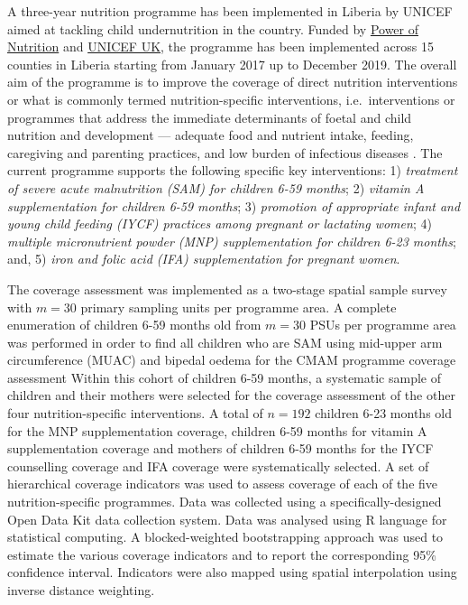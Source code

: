 \documentclass[12pt,a4paper]{article}
\begin{document}
A three-year nutrition programme has been implemented in Liberia by UNICEF aimed at tackling child undernutrition in the country. Funded by \href{http://www.powerofnutrition.org}{Power of Nutrition} and \href{https://www.unicef.org.uk}{UNICEF UK}, the programme has been implemented across 15 counties in Liberia starting from January 2017 up to December 2019. The overall aim of the programme is to improve the coverage of direct nutrition interventions or what is commonly termed nutrition-specific interventions, i.e.~interventions or programmes that address the immediate determinants of foetal and child nutrition and development --- adequate food and nutrient intake, feeding, caregiving and parenting practices, and low burden of infectious diseases \citep{Bhutta:2013ks, Ruel:2013kr}. The current programme supports the following specific key interventions: 1) \emph{treatment of severe acute malnutrition (SAM) for children 6-59 months}; 2) \emph{vitamin A supplementation for children 6-59 months}; 3) \emph{promotion of appropriate infant and young child feeding (IYCF) practices among pregnant or lactating women}; 4) \emph{multiple micronutrient powder (MNP) supplementation for children 6-23 months}; and, 5) \emph{iron and folic acid (IFA) supplementation for pregnant women}.

The coverage assessment was implemented as a two-stage spatial sample survey with \(m = 30\) primary sampling units per programme area. A complete enumeration of children 6-59 months old from \(m = 30\) PSUs per programme area was performed in order to find all children who are SAM using mid-upper arm circumference (MUAC) and bipedal oedema for the CMAM programme coverage assessment Within this cohort of children 6-59 months, a systematic sample of children and their mothers were selected for the coverage assessment of the other four nutrition-specific interventions. A total of \(n = 192\) children 6-23 months old for the MNP supplementation coverage, children 6-59 months for vitamin A supplementation coverage and mothers of children 6-59 months for the IYCF counselling coverage and IFA coverage were systematically selected. A set of hierarchical coverage indicators was used to assess coverage of each of the five nutrition-specific programmes. Data was collected using a specifically-designed Open Data Kit data collection system. Data was analysed using R language for statistical computing. A blocked-weighted bootstrapping approach was used to estimate the various coverage indicators and to report the corresponding 95\% confidence interval. Indicators were also mapped using spatial interpolation using inverse distance weighting.
\end{document}
